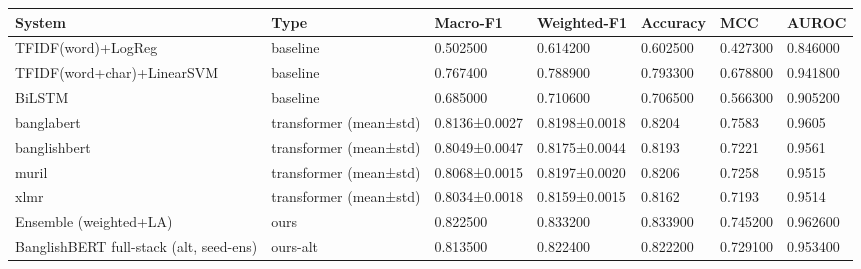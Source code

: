 \begin{tabular}{lllllll}
\toprule
System & Type & Macro-F1 & Weighted-F1 & Accuracy & MCC & AUROC \\
\midrule
TFIDF(word)+LogReg & baseline & 0.502500 & 0.614200 & 0.602500 & 0.427300 & 0.846000 \\
TFIDF(word+char)+LinearSVM & baseline & 0.767400 & 0.788900 & 0.793300 & 0.678800 & 0.941800 \\
BiLSTM & baseline & 0.685000 & 0.710600 & 0.706500 & 0.566300 & 0.905200 \\
banglabert & transformer (mean±std) & 0.8136±0.0027 & 0.8198±0.0018 & 0.8204 & 0.7583 & 0.9605 \\
banglishbert & transformer (mean±std) & 0.8049±0.0047 & 0.8175±0.0044 & 0.8193 & 0.7221 & 0.9561 \\
muril & transformer (mean±std) & 0.8068±0.0015 & 0.8197±0.0020 & 0.8206 & 0.7258 & 0.9515 \\
xlmr & transformer (mean±std) & 0.8034±0.0018 & 0.8159±0.0015 & 0.8162 & 0.7193 & 0.9514 \\
Ensemble (weighted+LA) & ours & 0.822500 & 0.833200 & 0.833900 & 0.745200 & 0.962600 \\
BanglishBERT full-stack (alt, seed-ens) & ours-alt & 0.813500 & 0.822400 & 0.822200 & 0.729100 & 0.953400 \\
\bottomrule
\end{tabular}
